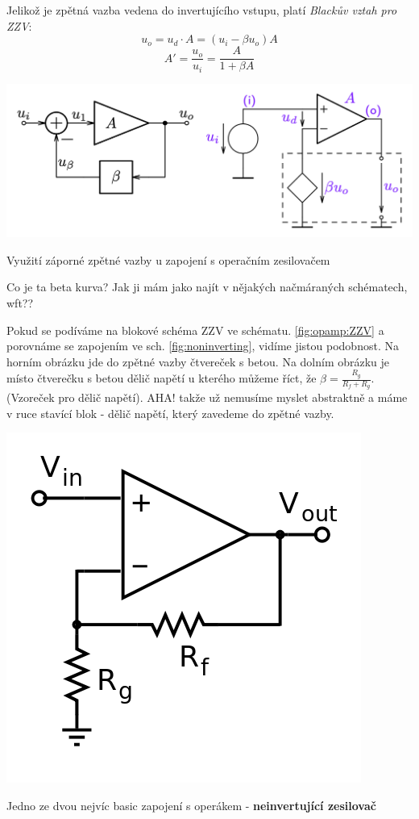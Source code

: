 \documentclass[a4paper,12pt]{article}   %
\begin{document}
Jelikož je zpětná vazba vedena do invertujícího vstupu, platí \textit{Blackův vztah pro ZZV}:
\begin{equation*}
    u_o = u_d\cdot A = (u_i -\beta u_o) A
\end{equation*}
\begin{equation}
    A' = \frac{u_o}{u_i} = \frac{A}{1+\beta A}
    \label{eq:vysledne:zesileni}
\end{equation}

\begin{schema}[h!]
    \centering
    \includegraphics[width=.7\textwidth]{ZZV-OZ.png}
    \caption{Využití záporné zpětné vazby u zapojení s operačním zesilovačem}
    \label{fig:opamp:ZZV}
\end{schema}

Co je ta beta kurva? Jak ji mám jako najít v nějakých načmáraných schématech, wft??

Pokud se podíváme na blokové schéma ZZV ve schématu. \ref{fig:opamp:ZZV} a porovnáme se zapojením ve sch. \ref{fig:noninverting}, vidíme jistou podobnost. Na horním obrázku jde do zpětné vazby čtvereček s betou. Na dolním obrázku je místo čtverečku s betou dělič napětí u kterého můžeme říct, že $\beta = \frac{R_g}{R_f + R_g}$. (Vzoreček pro dělič napětí). AHA! takže už nemusíme myslet abstraktně a máme v ruce stavící blok - dělič napětí, který zavedeme do zpětné vazby.

\begin{schema}[h!]
    \centering
    \includegraphics[width=.3\textwidth]{noninverting_opamp.png}
    \caption{Jedno ze dvou nejvíc basic zapojení s operákem - \textbf{neinvertující zesilovač}}
    \label{fig:noninverting}
\end{schema}
\end{document}
